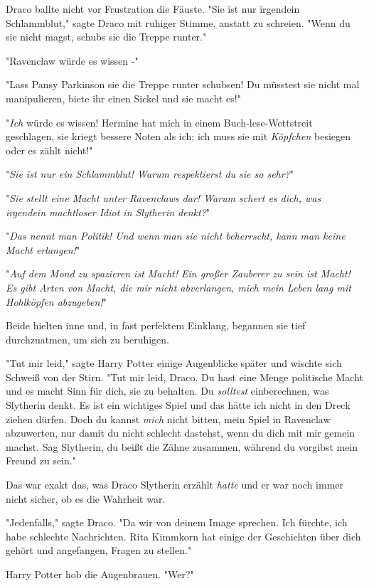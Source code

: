 {Draco ballte nicht vor Frustration die Fäuste. "Sie ist nur irgendein Schlammblut," sagte Draco mit ruhiger Stimme, anstatt zu schreien. "Wenn du sie nicht magst, schubs sie die Treppe runter."

"Ravenclaw würde es wissen -"

"Lass Pansy Parkinson sie die Treppe runter schubsen! Du müsstest sie nicht mal manipulieren, biete ihr einen Sickel und sie macht es!"

"\emph{Ich} würde es wissen! Hermine hat mich in einem Buch-lese-Wettstreit geschlagen, sie kriegt bessere Noten als ich; ich muss sie mit \emph{Köpfchen} besiegen oder es zählt nicht!"

"\emph{Sie ist nur ein Schlammblut! Warum respektierst du sie so sehr?}"

"\emph{Sie stellt eine Macht unter Ravenclaws dar! Warum schert es dich, was irgendein machtloser Idiot in Slytherin denkt?}"

"\emph{Das nennt man Politik! Und wenn man sie nicht beherrscht, kann man keine Macht erlangen!}"

"\emph{Auf dem Mond zu spazieren ist Macht! Ein großer Zauberer zu sein ist Macht! Es gibt Arten von Macht, die mir nicht abverlangen, mich mein Leben lang mit Hohlköpfen abzugeben!}"

Beide hielten inne und, in fast perfektem Einklang, begannen sie tief durchzuatmen, um sich zu beruhigen.

"Tut mir leid," sagte Harry Potter einige Augenblicke später und wischte sich Schweiß von der Stirn. "Tut mir leid, Draco. Du hast eine Menge politische Macht und es macht Sinn für dich, sie zu behalten. Du \emph{solltest} einberechnen, was Slytherin denkt. Es ist ein wichtiges Spiel und das hätte ich nicht in den Dreck ziehen dürfen. Doch du kannst \emph{mich} nicht bitten, mein Spiel in Ravenclaw abzuwerten, nur damit du nicht schlecht dastehst, wenn du dich mit mir gemein machst. Sag Slytherin, du beißt die Zähne zusammen, während du vorgibst mein Freund zu sein."

Das war exakt das, was Draco Slytherin erzählt \emph{hatte} und er war noch immer nicht sicher, ob es die Wahrheit war.

"Jedenfalls," sagte Draco. "Da wir von deinem Image sprechen. Ich fürchte, ich habe schlechte Nachrichten. Rita Kimmkorn hat einige der Geschichten über dich gehört und angefangen, Fragen zu stellen."

Harry Potter hob die Augenbrauen. "Wer?"

}
